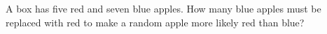 A box has five red and seven blue apples. How many blue apples must be replaced with red to make a random apple more likely red than blue?
